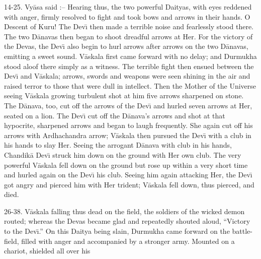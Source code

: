 14-25. Vy\=asa said :-- Hearing thus, the two powerful Daityas, with eyes reddened with anger, firmly resolved to fight and took bows and arrows in their hands. O Descent of Kuru! The Dev\={\i} then made a terrible noise and fearlessly stood there. The two D\=anavas then began to shoot dreadful arrows at Her. For the victory of the Devas, the Dev\={\i} also begin to hurl arrows after arrows on the two D\=anavas, emitting a sweet sound. V\=askala first came forward with no delay; and Durmukha stood aloof there simply as a witness. The terrible fight then ensued between the Dev\={\i} and V\=askala; arrows, swords and weapons were seen shining in the air and raised terror to those that were dull in intellect. Then the Mother of the Universe seeing V\=askala growing turbulent shot at him five arrows sharpened on stone. The D\=anava, too, cut off the arrows of the Dev\={\i} and hurled seven arrows at Her, seated on a lion. The Dev\={\i} cut off the D\=anava's arrows and shot at that hypocrite, sharpened arrows and began to laugh frequently. She again cut off his arrows with Ardhachandra arrow; V\=askala then pursued the Dev\={\i} with a club in his hands to slay Her. Seeing the arrogant D\=anava with club in his hands, Chandik\=a Dev\={\i} struck him down on the ground with Her own club. The very powerful V\=askala fell down on the ground but rose up within a very short time and hurled again on the Dev\={\i} his club. Seeing him again attacking Her, the Dev\={\i} got angry and pierced him with Her trident; V\=askala fell down, thus pierced, and died.

26-38. V\=askala falling thus dead on the field, the soldiers of the wicked demon routed; whereas the Devas became glad and repeatedly shouted aloud, ``Victory to the Dev\={\i}.'' On this Daitya being slain, Durmukha came forward on the battle-field, filled with anger and accompanied by a stronger army. Mounted on a chariot, shielded all over his

